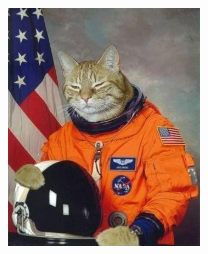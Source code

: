 \documentclass{article}
\begin{document}
\includegraphics[width=2in]  {../Resources/cat.jpg}
\end{document}
